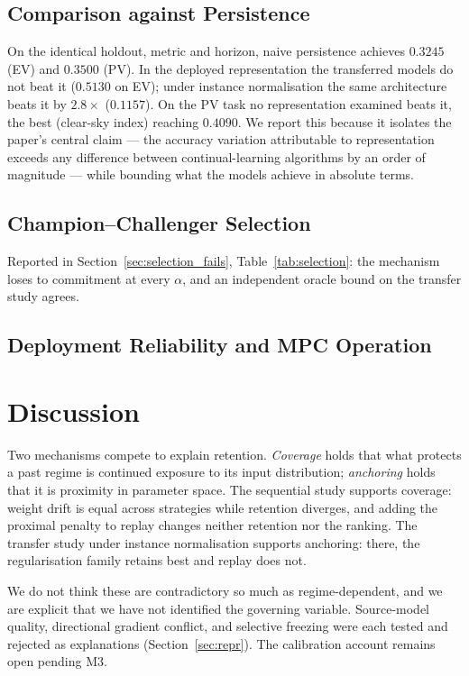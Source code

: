 \documentclass[journal]{IEEEtran}
\begin{document}
\subsection{Comparison against Persistence}
\label{sec:persistence}
On the identical holdout, metric and horizon, naive persistence achieves
$0.3245$ (EV) and $0.3500$ (PV). In the deployed representation the transferred
models do not beat it ($0.5130$ on EV); under instance normalisation the same
architecture beats it by $2.8\times$ ($0.1157$). On the PV task no
representation examined beats it, the best (clear-sky index) reaching $0.4090$.
We report this because it isolates the paper's central claim --- the accuracy
variation attributable to representation exceeds any difference between
continual-learning algorithms by an order of magnitude --- while bounding what
the models achieve in absolute terms.

\subsection{Champion--Challenger Selection}
Reported in Section~\ref{sec:selection_fails}, Table~\ref{tab:selection}: the
mechanism loses to commitment at every $\alpha$, and an independent oracle
bound on the transfer study agrees.

\subsection{Deployment Reliability and MPC Operation}

\section{Discussion}
\label{sec:discussion}

Two mechanisms compete to explain retention. \emph{Coverage} holds that what
protects a past regime is continued exposure to its input distribution;
\emph{anchoring} holds that it is proximity in parameter space. The sequential
study supports coverage: weight drift is equal across strategies while retention
diverges, and adding the proximal penalty to replay changes neither retention
nor the ranking. The transfer study under instance normalisation supports
anchoring: there, the regularisation family retains best and replay does not.

We do not think these are contradictory so much as regime-dependent, and we are
explicit that we have not identified the governing variable. Source-model
quality, directional gradient conflict, and selective freezing were each tested
and rejected as explanations (Section~\ref{sec:repr}). The calibration account
remains open pending M3.
\end{document}
